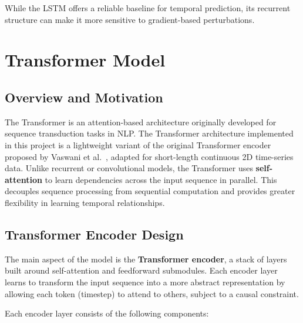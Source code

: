 While the LSTM offers a reliable baseline for temporal prediction, its recurrent structure can make it more sensitive to gradient-based perturbations.

\section{Transformer Model}

\subsection*{Overview and Motivation}
The Transformer is an attention-based architecture originally developed for sequence transduction tasks in NLP. The Transformer architecture implemented in this project is a lightweight variant of the original Transformer encoder proposed by Vaswani et al.~\cite{vaswani2017attention}, adapted for short-length continuous 2D time-series data. Unlike recurrent or convolutional models, the Transformer uses \textbf{self-attention} to learn dependencies across the input sequence in parallel. This decouples sequence processing from sequential computation and provides greater flexibility in learning temporal relationships.

\subsection*{Transformer Encoder Design}

The main aspect of the model is the \textbf{Transformer encoder}, a stack of layers built around self-attention and feedforward submodules. Each encoder layer learns to transform the input sequence into a more abstract representation by allowing each token (timestep) to attend to others, subject to a causal constraint.

Each encoder layer consists of the following components:

